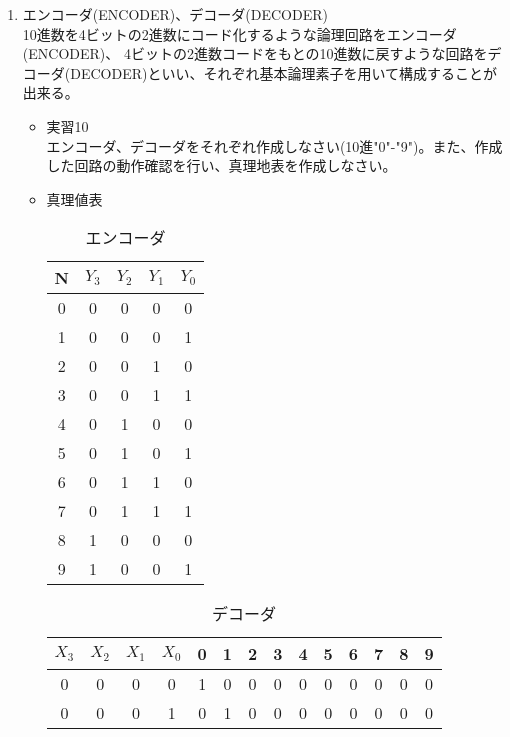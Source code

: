 \documentclass[dvipdfmx,a4paper]{jsarticle}
\begin{document}
\begin{enumerate}
\begin{itemize}
\begin{table}[H]
								\end{table}
						\end{itemize}
					\item エンコーダ(ENCODER)、デコーダ(DECODER) \\
						10進数を4ビットの2進数にコード化するような論理回路をエンコーダ(ENCODER)、
						4ビットの2進数コードをもとの10進数に戻すような回路をデコーダ(DECODER)といい、それぞれ基本論理素子を用いて構成することが出来る。
						\begin{itemize}
							\item 実習10 \\
								エンコーダ、デコーダをそれぞれ作成しなさい(10進"0"-"9")。また、作成した回路の動作確認を行い、真理地表を作成しなさい。
							\item 真理値表
								\begin{table}[H]
								\center
								\caption{エンコーダ\label{tb:encoder}}
								\begin{tabular}{|c|c|c|c|c|}
									\hline
									N & $Y_3$ & $Y_2$ & $Y_1$ &$Y_0$ \\ \hline
									0 & 0 & 0 & 0 & 0 \\ \hline
									1 & 0 & 0 & 0 & 1\\ \hline
									2 & 0 & 0 & 1 & 0\\ \hline
									3 & 0 & 0 & 1 & 1\\ \hline
									4 & 0 & 1 & 0 & 0 \\ \hline
									5 & 0 & 1 & 0 & 1\\ \hline
									6 & 0 & 1 & 1 & 0\\ \hline
									7 & 0 & 1 & 1 & 1\\ \hline
									8 & 1 & 0 & 0 & 0\\ \hline
									9 & 1 & 0 & 0 & 1\\ \hline
								\end{tabular}
							\end{table}					
							\begin{table}[H]
								\center
								\caption{デコーダ\label{tb:encoder}}
								\begin{tabular}{|c|c|c|c|c|c|c|c|c|c|c|c|c|c|}
									\hline
									$X_3$ & $X_2$ & $X_1$ & $X_0$ & 0 & 1 & 2 & 3 & 4 & 5 & 6 & 7 & 8 & 9 \\ \hline
										0 &     0 &     0 &     0 & 1 & 0 & 0 & 0 & 0 & 0 & 0 & 0 & 0 & 0 \\ \hline
										0 &     0 &     0 &     1 & 0 & 1 & 0 & 0 & 0 & 0 & 0 & 0 & 0 & 0 \\ \hline

\end{tabular}
\end{table}
\end{itemize}
\end{enumerate}
\end{document}
